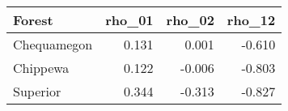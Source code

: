 \begin{table}[ht]
\begin{center}
\begin{tabular}{lrrr}
  \hline
Forest & rho\_01 & rho\_02 & rho\_12 \\ 
  \hline
Chequamegon & 0.131 & 0.001 & -0.610 \\ 
  Chippewa & 0.122 & -0.006 & -0.803 \\ 
  Superior & 0.344 & -0.313 & -0.827 \\ 
   \hline
\end{tabular}
\end{center}
\end{table}
